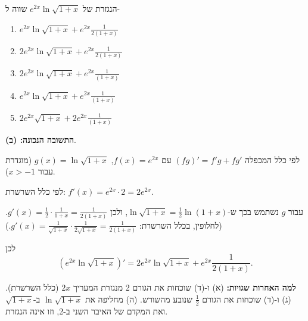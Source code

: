 
\begin{question}
הנגזרת של $e^{2x}\ln\sqrt{1+x}$ שווה ל-
\begin{enumerate}
  \item $e^{2x}\ln\sqrt{1+x}+e^{2x}\frac{1}{2(1+x)}$
  \item $2e^{2x}\ln\sqrt{1+x}+e^{2x}\frac{1}{2(1+x)}$
  \item $2e^{2x}\ln\sqrt{1+x}+e^{2x}\frac{1}{(1+x)}$
  \item $e^{2x}\ln\sqrt{1+x}+e^{2x}\frac{1}{(1+x)}$
  \item $2e^{2x}\sqrt{1+x}+2e^{2x}\frac{1}{(1+x)}$
\end{enumerate}
\end{question}

\begin{solution}
\textbf{התשובה הנכונה: (ב)}.

לפי כלל המכפלה $(fg)'=f'g+fg'$ עם $f(x)=e^{2x}$, $g(x)=\ln\sqrt{1+x}$ (מוגדרת עבור $x>-1$).

לפי כלל השרשרת: $f'(x)=e^{2x}\cdot 2=2e^{2x}$.

עבור $g$ נשתמש בכך ש-$\ln\sqrt{1+x}=\frac12\ln(1+x)$, ולכן $g'(x)=\frac12\cdot\frac{1}{1+x}=\frac{1}{2(1+x)}$.
(לחלופין, בכלל השרשרת: $g'(x)=\frac{1}{\sqrt{1+x}}\cdot\frac{1}{2\sqrt{1+x}}=\frac{1}{2(1+x)}$.)

לכן
\[
\left(e^{2x}\ln\sqrt{1+x}\right)'=\boxed{2e^{2x}\ln\sqrt{1+x}+e^{2x}\frac{1}{2(1+x)}} .
\]

\textbf{למה האחרות שגויות:} (א) ו-(ד) שוכחות את הגורם 2 מנגזרת המעריך $2x$ (כלל השרשרת). (ג) ו-(ד) שוכחות את הגורם $\frac12$ שנובע מהשורש. (ה) מחליפה את $\ln\sqrt{1+x}$ ב-$\sqrt{1+x}$ ואת המקדם של האיבר השני ב-2, וזו אינה הנגזרת.
\end{solution}
